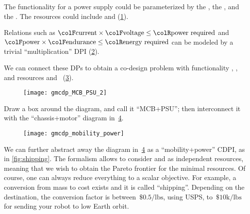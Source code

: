 \begin{example}
  \noindent The functionality for a power supply could be parameterized
  by the , the , and the .
  The resources could include  and  (\cref{fig:example-ba}).

  \begin{figure}[h]
    \centering
    \caption{\label{fig:example-ba}}
  \end{figure}



  Relations such as ${\colF\mbox{current}}\times{\colF\mbox{voltage}}\leq{\colR\mbox{power required}}$
  and ${\colF\mbox{power}}\times{\colF\mbox{endurance}}\leq{\colR\mbox{energy required}}$
  can be modeled by a trivial ``multiplication'' DPI (\cref{fig:current_times_voltage}).

  \begin{figure}[h]
    \centering
    \caption{\label{fig:current_times_voltage}}
  \end{figure}


  We can connect these DPs to obtain a co-design problem with
  functionality , ,  and resources
   and ~(\cref{fig:connect}).

  \begin{figure}[h]
    \centering
    \texttt{[image: gmcdp\_MCB\_PSU\_2]}
    \caption{\label{fig:connect}}
  \end{figure}


  Draw a box around the diagram, and call it ``MCB+PSU'';
  then interconnect it with the ``chassis+motor'' diagram in~\cref{fig:another}.


  \begin{figure}[h]
    \begin{centering}
      \texttt{[image: gmcdp\_mobility\_power]}
    \end{centering}
    \caption{\label{fig:another}}
  \end{figure}

  We can further abstract away the diagram in~\cref{fig:another} as
  a ``mobility+power'' CDPI, as in \cref{fig:shipping}. The formalism
  allows to consider  and  as independent resources,
  meaning that we wish to obtain the Pareto frontier for the minimal
  resources. Of course, one can always reduce everything to a scalar
  objective. For example, a conversion from mass to cost exists and
  it is called ``shipping''. Depending on the destination, the conversion
  factor is between~$\$0.5/\mbox{lbs}$, using USPS, to~$\$10\mbox{k}/\mbox{lbs}$
  for sending your robot to low Earth orbit.



\end{example}
